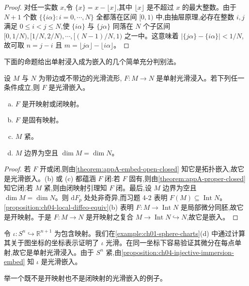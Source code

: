 \documentclass[../../main.tex]{subfiles}
\begin{document}
\begin{proof}
对任一实数 $x$,令 $\{x\}=x-\lfloor x\rfloor$,其中 $\lfloor x\rfloor$ 是不超过 $x$ 的最大整数。由于 $N+1$ 个数 $\{\{i\alpha\}:i=0,\cdots ,N\}$ 全都落在区间 $[0,1)$ 中,由抽屉原理,必存在整数 $i,j$ 满足 $0\leqslant i<j\leqslant N$,使 $\{i\alpha\}$ 与 $\{j\alpha\}$ 同落在 $N$ 个子区间 $[0,1/N),[1/N,2/N),\cdots ,[(N-1)/N,1)$ 之一中。这意味着 $|\{j\alpha\}-\{i\alpha\}|<1/N$,故可取 $n=j-i$ 且 $m=\lfloor j\alpha\rfloor-\lfloor i\alpha\rfloor$。
\end{proof}

下面的命题给出单射浸入成为嵌入的几个简单充分判别法。

\begin{proposition}\label{proposition:ch04-injective-immersion-embed}
设 $M$ 与 $N$ 为带边或不带边的光滑流形, $F:M\to N$ 是单射光滑浸入。若下列任一条件成立,则 $F$ 是光滑嵌入。
\begin{enumerate}[(a)]
\item $F$ 是开映射或闭映射。
\item $F$ 是固有映射。
\item $M$ 紧。
\item $M$ 边界为空且 $\dim M=\dim N$。
\end{enumerate}
\end{proposition}

\begin{proof}
若 $F$ 开或闭,则由\cref{theorem:appA-embed-open-closed} 知它是拓扑嵌入,故它是光滑嵌入。(b) 或 (c) 都蕴涵 $F$ 闭:若 $F$ 固有,则由\cref{theorem:appA-proper-closed} 知它闭;若 $M$ 紧,则由闭映射引理知 $F$ 闭。最后,设 $M$ 边界为空且 $\dim M=\dim N$。则 $\mathrm{d}F_p$ 处处非奇异,而习题 4-2 表明 $F(M)\subseteq\operatorname{Int}N$。\cref{proposition:ch04-local-diffeo-equiv}(b) 表明 $F:M\to\operatorname{Int}N$ 是局部微分同胚,故它是开映射。于是 $F:M\to N$ 是开映射之复合 $M\to\operatorname{Int}N\hookrightarrow N$,故它是嵌入。
\end{proof}

\begin{example}\label{example:ch04-sphere-inclusion}
令 $\iota:S^n\hookrightarrow\mathbb{R}^{n+1}$ 为包含映射。我们在\cref{example:ch01-sphere-charts}(d) 中通过计算其关于图坐标的坐标表示证明了 $\iota$ 光滑。在同一坐标下容易验证其微分在每点单射,故它是单射光滑浸入。由于 $S^n$ 紧,由\cref{proposition:ch04-injective-immersion-embed} 知 $\iota$ 是光滑嵌入。
\end{example}

\begin{exercise}\label{exercise:ch04-embedding-not-open-closed}
举一个既不是开映射也不是闭映射的光滑嵌入的例子。
\end{exercise}
\end{document}
